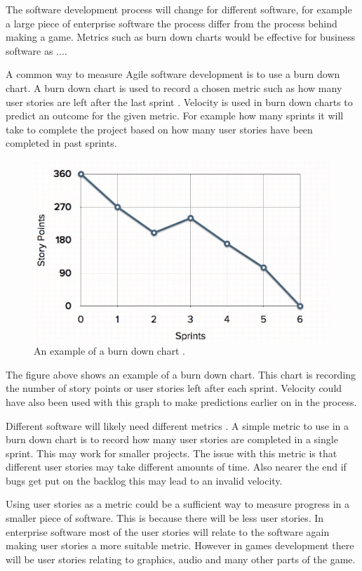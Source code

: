 \documentclass{scrartcl}
\begin{document}
The software development process will change for different software, for example a large piece of enterprise software the process differ from the process behind making a game. Metrics such as burn down charts would be effective for business software as ....

A common way to measure Agile software development is to use a burn down chart. A burn down chart is used to record a chosen metric such as how many user stories are left after the last sprint \cite{AgileWithScrum}. Velocity is used in burn down charts to predict an outcome for the given metric. For example how many sprints it will take to complete the project based on how many user stories have been completed in past sprints.

\begin{figure}[h]
	\includegraphics[width=1.0\linewidth]{BDChart.jpg}
	\caption{ An example of a burn down chart \cite{MGS}.}
\end{figure}
	
The figure above shows an example of a burn down chart. This chart is recording the number of story points or user stories left after each sprint. Velocity could have also been used with this graph to make predictions earlier on in the process. 

Different software will likely need different metrics  \cite{Misra}. %
 A simple metric to use in a burn down chart is to record how many user stories are completed in a single sprint. This may work for smaller projects. The issue with this metric is that different user stories may take different amounts of time. Also nearer the end if bugs get put on the backlog this may lead to an invalid velocity.

Using user stories as a metric could be a sufficient way to measure progress in a smaller piece of software. This is because there will be less user stories. In enterprise software most of the user stories will relate to the software again making user stories a more suitable metric. However in games development there will be user stories relating to graphics, audio and many other parts of the game. 
\end{document}
